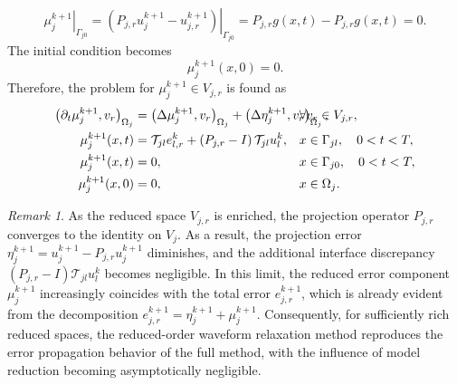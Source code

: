 \documentclass[a4paper, 11pt]{article}
\theoremstyle{plain}
\theoremstyle{definition}
\theoremstyle{remark}
\newtheorem{remark}[equation]{Remark}
\begin{document}
\begin{equation*}
    \left.\mu_{j}^{k+1}\right|_{\Gamma_{j0}} = \left.\left(P_{j,r}u_{j}^{k+1} - u_{j, r}^{k+1}\right)\right|_{\Gamma_{j0}} = P_{j, r}g(x, t) - P_{j, r}g(x, t) = 0.
\end{equation*}
The initial condition becomes
\begin{equation*}
    \mu_{j}^{k+1}(x, 0) = 0.
\end{equation*}
Therefore, the problem for $\mu_{j}^{k+1}\in V_{j, r}$ is found as
\begin{align*}
    \left(\partial_{t}\mu_{j}^{k+1}, v_{r}\right)_{\Omega_{j}} &=  \left(\Delta \mu_{j}^{k+1}, v_{r}\right)_{\Omega_{j}} + \left(\Delta \eta_{j}^{k+1}, v_{r}\right)_{\Omega_{j}}, \hspace{-50pt}&& \forall v_{r}\in V_{j, r},\\
    \mu_{j}^{k+1}(x, t) &= \mathcal{T}_{jl}e_{l, r}^{k} + \left(P_{j, r} -I \right)\mathcal{T}_{jl}u_{l}^{k}, && x\in \Gamma_{jl}, \quad 0<t<T,\\
    \mu_{j}^{k+1}(x, t) &= 0, && x\in \Gamma_{j0}, \quad 0<t<T,\\
    \mu_{j}^{k+1}(x, 0) &= 0, && x\in \Omega_{j}.
\end{align*}
\begin{remark}
    As the reduced space $V_{j,r}$ is enriched, the projection operator $P_{j,r}$ converges to the identity on $V_j$. As a result, the projection error $\eta_j^{k+1} = u_j^{k+1} - P_{j,r}u_j^{k+1}$ diminishes, and the additional interface discrepancy $(P_{j,r} - I)\mathcal{T}_{jl}u_l^k$ becomes negligible. In this limit, the reduced error component $\mu_j^{k+1}$ increasingly coincides with the total error $e_{j,r}^{k+1}$, which is already evident from the decomposition $e_{j,r}^{k+1} = \eta_j^{k+1} + \mu_j^{k+1}$. Consequently, for sufficiently rich reduced spaces, the reduced-order waveform relaxation method reproduces the error propagation behavior of the full method, with the influence of model reduction becoming asymptotically negligible.
\end{remark}
\end{document}
